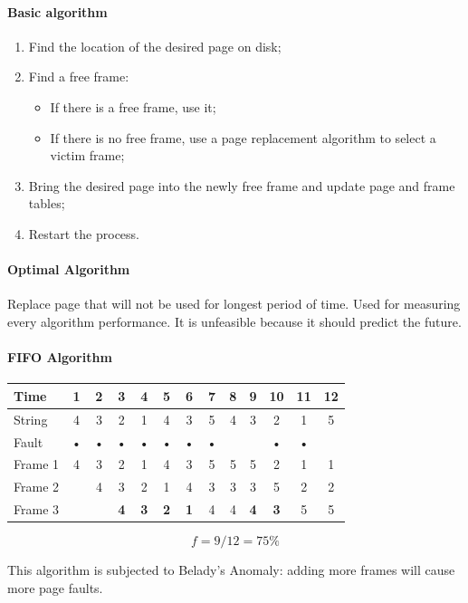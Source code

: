 \paragraph{Basic algorithm}
\begin{enumerate}
\item Find the location of the desired page on disk;
\item Find a free frame:
\begin{itemize}
\item If there is a free frame, use it;
\item If there is no free frame, use a page replacement algorithm to select a victim frame;
\end{itemize}
\item Bring the desired page into the newly free frame and update page and frame tables;
\item Restart the process.
\end{enumerate}

\paragraph{Optimal Algorithm}
Replace page that will not be used for longest period of time. Used for measuring every algorithm performance. It is unfeasible because it should predict the future.

\paragraph{FIFO Algorithm}
\begin{center}
\begin{tabular}{l|cccccccccccc}
\hline
Time & 1 & 2 & 3 & 4 & 5 & 6 & 7 & 8 & 9 & 10 & 11 & 12 \\
\hline
String & 4 & 3 & 2 & 1 & 4 & 3 & 5 & 4 & 3 & 2 & 1 & 5 \\
\hline
Fault & • & • & • & • & • & • & • &  &  & • & • &  \\
\hline
Frame 1 & 4 & 3 & 2 & 1 & 4 & 3 & 5 & 5 & 5 & 2 & 1 & 1 \\
Frame 2 & & 4 & 3 & 2 & 1 & 4 & 3 & 3 & 3 & 5 & 2 & 2 \\
Frame 3 &  &  & \textbf{4} & \textbf{3} & \textbf{2} & \textbf{1} & 4 & 4 & \textbf{4} & \textbf{3} & 5 & 5 \\
\hline
\end{tabular}
\[ f = 9/12 = 75 \% \]
\end{center}
This algorithm is subjected to Belady's Anomaly: adding more frames will cause more page faults.

